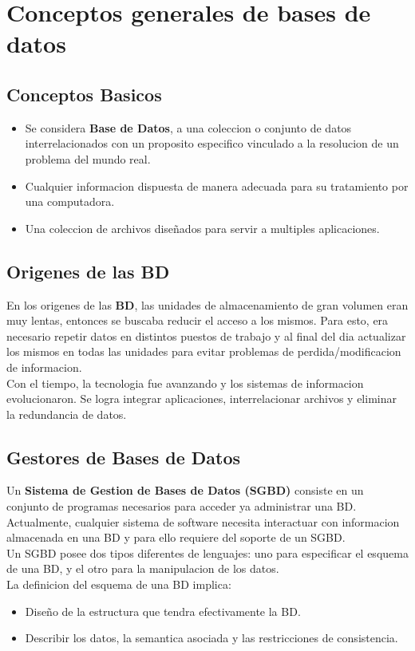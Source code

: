 \section{Conceptos generales de bases de datos}
\subsection{Conceptos Basicos}
\begin{itemize}
\item Se considera \textbf{Base de Datos}, a una coleccion o conjunto de datos interrelacionados con un proposito especifico vinculado a la resolucion de un problema del mundo real.
\item Cualquier informacion dispuesta de manera adecuada para su tratamiento por una computadora.
\item Una coleccion de archivos diseñados para servir a multiples aplicaciones.
\end{itemize}

\subsection{Origenes de las BD}

En los origenes de las \textbf{BD}, las unidades de almacenamiento de gran volumen eran muy lentas, entonces se buscaba reducir el acceso a los mismos. Para esto, era necesario repetir datos en distintos puestos de trabajo y al final del dia actualizar los mismos en todas las unidades para evitar problemas de perdida/modificacion de informacion. \\
Con el tiempo, la tecnologia fue avanzando y los sistemas de informacion evolucionaron. Se logra integrar aplicaciones, interrelacionar archivos y eliminar la redundancia de datos.

\subsection{Gestores de Bases de Datos}
Un \textbf{Sistema de Gestion de Bases de Datos (SGBD)} consiste en un conjunto de programas necesarios para acceder ya administrar una BD. \\
Actualmente, cualquier sistema de software necesita interactuar con informacion almacenada en una BD y para ello requiere del soporte de un SGBD. \\
Un SGBD posee dos tipos diferentes de lenguajes: uno para especificar el esquema de una BD, y el otro para la manipulacion de los datos.\\
La definicion del esquema de una BD implica:
\begin{itemize}
  \item Diseño de la estructura que tendra efectivamente la BD.
  \item Describir los datos, la semantica asociada y las restricciones de consistencia.
\end{itemize}

